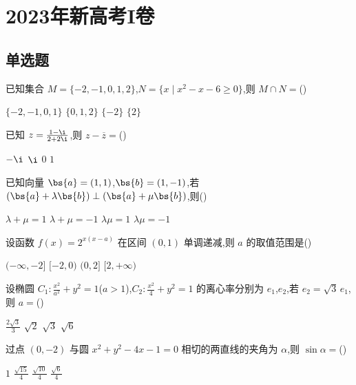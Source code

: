 
\chapter{2023年新高考I卷}

\section{单选题}

\begin{problem}
已知集合 \(M=\{-2,-1,0,1,2\}\),\(N=\{x\mid x^2-x-6\ge 0\}\),则 \(M\cap N=\)(\quad)

\choices
    {\(\{-2,-1,0,1\}\)}
    {\(\{0,1,2\}\)}
    {\(\{-2\}\)}
    {\(\{2\}\)}
\end{problem}

\begin{problem}
已知 \(z=\frac{1-\i}{2+2\i}\),则 \(z-\overline z=\)(\quad)

\choices
    {\(-\i\)}
    {\(\i\)}
    {\(0\)}
    {\(1\)}
\end{problem}

\begin{problem}
已知向量 \(\bs{a}=(1,1)\),\(\bs{b}=(1,-1)\),若 \((\bs{a}+\lambda\bs{b})\perp(\bs{a}+\mu\bs{b})\),则(\quad)

\choices
    {\(\lambda+\mu=1\)}
    {\(\lambda+\mu=-1\)}
    {\(\lambda\mu=1\)}
    {\(\lambda\mu=-1\)}
\end{problem}

\begin{problem}
设函数 \(f(x)=2^{x(x-a)}\) 在区间 \((0,1)\) 单调递减,则 \(a\) 的取值范围是(\quad)

\choices
    {\((-\infty,-2]\)}
    {\([-2,0)\)}
    {\((0,2]\)}
    {\([2,+\infty)\)}
\end{problem}

\begin{problem}
设椭圆 \(C_1:\frac{x^2}{a^2}+y^2=1\)(\(a>1\)),\(C_2:\frac{x^2}{4}+y^2=1\) 的离心率分别为 \(e_1\),\(e_2\),若 \(e_2=\sqrt3\,e_1\),则 \(a=\)(\quad)

\choices
    {\(\frac{2\sqrt3}{3}\)}
    {\(\sqrt2\)}
    {\(\sqrt3\)}
    {\(\sqrt6\)}
\end{problem}

\begin{problem}
过点 \((0,-2)\) 与圆 \(x^2+y^2-4x-1=0\) 相切的两直线的夹角为 \(\alpha\),则 \(\sin\alpha=\)(\quad)

\choices
    {\(1\)}
    {\(\frac{\sqrt{15}}{4}\)}
    {\(\frac{\sqrt{10}}{4}\)}
    {\(\frac{\sqrt6}{4}\)}
\end{problem}

